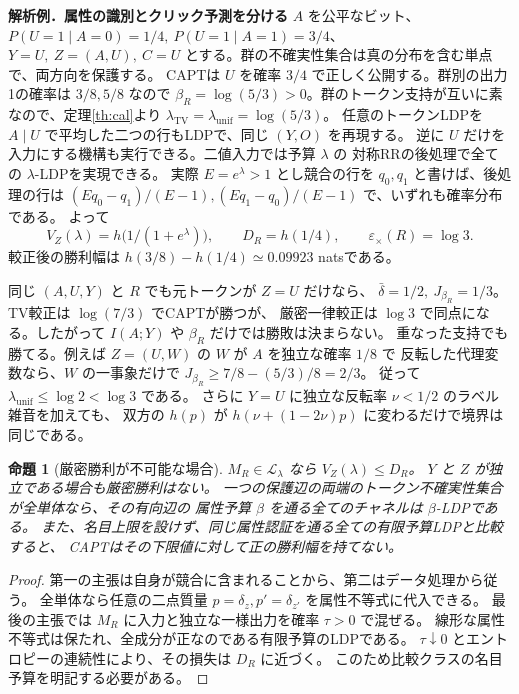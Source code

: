 \documentclass[a4paper,11pt]{ltjsarticle}
\theoremstyle{jp}
\newtheorem{prop}[thm]{命題}
\newcommand{\Dc}{D_R}
\newcommand{\V}{V_Z}
\newcommand{\cL}{\mathcal L}
\newcommand{\ecr}{\varepsilon_\times}
\newcommand{\para}[1]{\par\Needspace{3\baselineskip}\addvspace{.6\baselineskip}\noindent\textbf{#1}\enspace}
\begin{document}
\para{解析例．属性の識別とクリック予測を分ける}
\(A\) を公平なビット、\(P(U=1\mid A=0)=1/4,\ P(U=1\mid A=1)=3/4\)、
\(Y=U,\ Z=(A,U),\ C=U\) とする。群の不確実性集合は真の分布を含む単点で、両方向を保護する。
CAPTは \(U\) を確率 \(3/4\) で正しく公開する。群別の出力1の確率は \(3/8,5/8\) なので
\(\beta_R=\log(5/3)>0\)。群のトークン支持が互いに素なので、定理\ref{th:cal}より
\(\lambda_{\mathrm{TV}}=\lambda_{\mathrm{unif}}=\log(5/3)\)。
任意のトークンLDPを \(A\mid U\) で平均した二つの行もLDPで、同じ \((Y,O)\) を再現する。
逆に \(U\) だけを入力にする機構も実行できる。二値入力では予算 \(\lambda\) の
対称RRの後処理で全ての \(\lambda\)-LDPを実現できる。
実際 \(E=e^\lambda>1\) とし競合の行を \(q_0,q_1\) と書けば、後処理の行は
\((Eq_0-q_1)/(E-1),(Eq_1-q_0)/(E-1)\) で、いずれも確率分布である。
よって
\[
 \V(\lambda)=h\bigl(1/(1+e^\lambda)\bigr),\qquad
 \Dc=h(1/4),\qquad \ecr(R)=\log3 .
\]
較正後の勝利幅は \(h(3/8)-h(1/4)\simeq0.09923\) natsである。

同じ \((A,U,Y)\) と \(R\) でも元トークンが \(Z=U\) だけなら、
\(\bar\delta=1/2,\ J_{\beta_R}=1/3\)。TV較正は \(\log(7/3)\) でCAPTが勝つが、
厳密一律較正は \(\log3\) で同点になる。したがって \(I(A;Y)\) や \(\beta_R\) だけでは勝敗は決まらない。
重なった支持でも勝てる。例えば \(Z=(U,W)\) の \(W\) が \(A\) を独立な確率 \(1/8\) で
反転した代理変数なら、\(W\) の一事象だけで \(J_{\beta_R}\ge 7/8-(5/3)/8=2/3\)。
従って \(\lambda_{\mathrm{unif}}\le\log2<\log3\) である。
さらに \(Y=U\) に独立な反転率 \(\nu<1/2\) のラベル雑音を加えても、
双方の \(h(p)\) が \(h(\nu+(1-2\nu)p)\) に変わるだけで境界は同じである。

\begin{prop}[厳密勝利が不可能な場合]\label{th:impossible}
\(M_R\in\cL_\lambda\) なら \(\V(\lambda)\le\Dc\)。
\(Y\) と \(Z\) が独立である場合も厳密勝利はない。
一つの保護辺の両端のトークン不確実性集合が全単体なら、その有向辺の
属性予算 \(\beta\) を通る全てのチャネルは \(\beta\)-LDPである。
また、名目上限を設けず、同じ属性認証を通る全ての有限予算LDPと比較すると、
CAPTはその下限値に対して正の勝利幅を持てない。
\end{prop}
\begin{proof}
第一の主張は自身が競合に含まれることから、第二はデータ処理から従う。
全単体なら任意の二点質量 \(p=\delta_z,p'=\delta_{z'}\) を属性不等式に代入できる。
最後の主張では \(M_R\) に入力と独立な一様出力を確率 \(\tau>0\) で混ぜる。
線形な属性不等式は保たれ、全成分が正なのである有限予算のLDPである。
\(\tau\downarrow0\) とエントロピーの連続性により、その損失は \(\Dc\) に近づく。
このため比較クラスの名目予算を明記する必要がある。
\end{proof}
\end{document}
